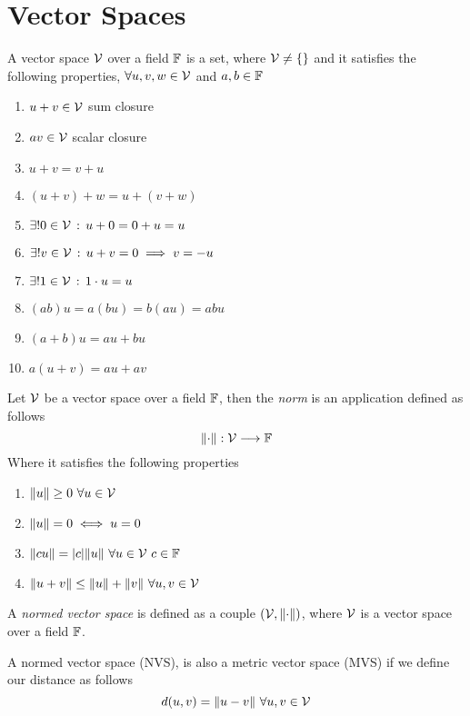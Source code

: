 \documentclass[../complete.tex]{subfiles}
\begin{document}
\section{Vector Spaces}
\begin{dfn}
	A vector space $\mathcal{V}$ over a field $\mathbb{F}$ is a set, where $\mathcal{V}\ne\{\}$ and it satisfies the following properties, $\forall u,v,w\in\mathcal{V}$ and $a,b\in\mathbb{F}$
	\begin{enumerate}
	\item $u+v\in\mathcal{V}$ sum closure
	\item $av\in\mathcal{V}$ scalar closure
	\item $u+v=v+u$
	\item $(u+v)+w=u+(v+w)$
	\item $\exists!0\in\mathcal{V}\, :\,  u+0=0+u=u$
	\item $\exists!v\in\mathcal{V}\, :\,  u+v=0\implies v=-u$
	\item $\exists!1\in\mathcal{V}\, :\,  1\cdot u=u$
	\item $(ab)u=a(bu)=b(au)=abu$
	\item $(a+b)u=au+bu$
	\item $a(u+v)=au+av$
	\end{enumerate}
\end{dfn}
\begin{dfn}[Norm]
	Let $\mathcal{V}$ be a vector space over a field $\mathbb{F}$, then the \textit{norm} is an application defined as follows
	\begin{equation*}
		\norm{\cdot}:\mathcal{V}\overset{}{\longrightarrow}\mathbb{F}
	\end{equation*}
	Where it satisfies the following properties
	\begin{enumerate}
	\item $\norm{u}\ge0\ \forall u\in\mathcal{V}$
	\item $\norm{u}=0\iff u=0$
	\item $\norm{cu}=\abs{c}\norm{u}\ \forall u\in\mathcal{V}\ c\in\mathbb{F}$
	\item $\norm{u+v}\le\norm{u}+\norm{v}\ \forall u,v\in\V$
	\end{enumerate}
\end{dfn}
\begin{dfn}
	A \textit{normed vector space} is defined as a couple $(\mathcal{V},\norm{\cdot})$, where $\mathcal{V}$ is a vector space over a field $\mathbb{F}$.
\end{dfn}
\begin{prop}
	A normed vector space (NVS), is also a metric vector space (MVS) if we define our distance as follows
	\begin{equation*}
		d(u,v)=\norm{u-v}\ \forall u,v\in\mathcal{V}
	\end{equation*}
\end{prop}
\end{document}
